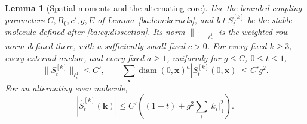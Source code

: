 \documentclass[11pt]{article}
\numberwithin{equation}{section}
\newtheorem{lemma}[theorem]{Lemma}
\theoremstyle{remark}
\newcommand{\diam}{\operatorname{diam}}
\begin{document}
\begin{lemma}[Spatial moments and the alternating core]\label{ba:lem:moment}
Use the bounded-coupling parameters $C,B_0,c',g,E$ of
Lemma~\ref{ba:lem:kernels}, and let $S_t^{[k]}$ be the stable molecule defined after \eqref{ba:eq:dissection}.
Its norm $\|\cdot\|_{\ell^1_c}$ is the weighted row norm defined there,
with a sufficiently small fixed $c>0$.
For every fixed $k\ge3$, every external anchor, and every fixed
$a\ge1$, uniformly for $g\le C$, $0\le t\le1$,
\begin{equation}\label{ba:eq:moment}
 \|S_t^{[k]}\|_{\ell^1_c}\le C',\qquad
 \sum_{\boldsymbol x}\diam(0,\boldsymbol x)^a
       |S_t^{[k]}(0,\boldsymbol x)|\le C'g^2.
\end{equation}
For an alternating even molecule,
\begin{equation}\label{ba:eq:cancel}
 |\widehat S_t^{[k]}(\boldsymbol k)|
       \le C'\left((1-t)+g^2\sum_i|k_i|_{\mathbb T}^2\right).
\end{equation}
\end{lemma}
\end{document}
